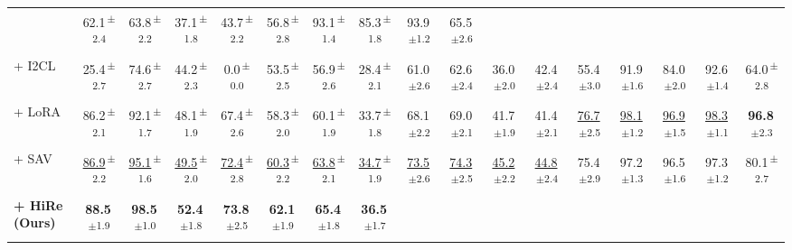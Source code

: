 \documentclass[sigconf,review,anonymous,9pt,table]{acmart}
\begin{document}
\begin{table}[t]
{\begin{tabular}{@{}l
  c c
  c c c c c
  c c c c
  c c c c c
  @{}}
  & 62.1\textsuperscript{\,$\pm$2.4} & 63.8\textsuperscript{\,$\pm$2.2} & 37.1\textsuperscript{\,$\pm$1.8} & 43.7\textsuperscript{\,$\pm$2.2}
  & 56.8\textsuperscript{\,$\pm$2.8} & 93.1\textsuperscript{\,$\pm$1.4} & 85.3\textsuperscript{\,$\pm$1.8} & 93.9\textsuperscript{\,$\pm$1.2} & 65.5\textsuperscript{\,$\pm$2.6} \\
+ I2CL~\cite{li2025implicit}
  & 25.4\textsuperscript{\,$\pm$2.7} & 74.6\textsuperscript{\,$\pm$2.7} & 44.2\textsuperscript{\,$\pm$2.3} & 0.0\textsuperscript{\,$\pm$0.0} & 53.5\textsuperscript{\,$\pm$2.5} & 56.9\textsuperscript{\,$\pm$2.6} & 28.4\textsuperscript{\,$\pm$2.1}
  & 61.0\textsuperscript{\,$\pm$2.6} & 62.6\textsuperscript{\,$\pm$2.4} & 36.0\textsuperscript{\,$\pm$2.0} & 42.4\textsuperscript{\,$\pm$2.4}
  & 55.4\textsuperscript{\,$\pm$3.0} & 91.9\textsuperscript{\,$\pm$1.6} & 84.0\textsuperscript{\,$\pm$2.0} & 92.6\textsuperscript{\,$\pm$1.4} & 64.0\textsuperscript{\,$\pm$2.8} \\
+ LoRA~\cite{hu2022lora}
  & 86.2\textsuperscript{\,$\pm$2.1} & 92.1\textsuperscript{\,$\pm$1.7} & 48.1\textsuperscript{\,$\pm$1.9} & 67.4\textsuperscript{\,$\pm$2.6} & 58.3\textsuperscript{\,$\pm$2.0} & 60.1\textsuperscript{\,$\pm$1.9} & 33.7\textsuperscript{\,$\pm$1.8}
  & 68.1\textsuperscript{\,$\pm$2.2} & 69.0\textsuperscript{\,$\pm$2.1} & 41.7\textsuperscript{\,$\pm$1.9} & 41.4\textsuperscript{\,$\pm$2.1}
  & \underline{76.7}\textsuperscript{\,$\pm$2.5} & \underline{98.1}\textsuperscript{\,$\pm$1.2} & \underline{96.9}\textsuperscript{\,$\pm$1.5} & \underline{98.3}\textsuperscript{\,$\pm$1.1} & \textbf{96.8}\textsuperscript{\,$\pm$2.3} \\
+ SAV~\cite{mitra2025enhancing}
  & \underline{86.9}\textsuperscript{\,$\pm$2.2} & \underline{95.1}\textsuperscript{\,$\pm$1.6} & \underline{49.5}\textsuperscript{\,$\pm$2.0} & \underline{72.4}\textsuperscript{\,$\pm$2.8} & \underline{60.3}\textsuperscript{\,$\pm$2.2} & \underline{63.8}\textsuperscript{\,$\pm$2.1} & \underline{34.7}\textsuperscript{\,$\pm$1.9}
  & \underline{73.5}\textsuperscript{\,$\pm$2.6} & \underline{74.3}\textsuperscript{\,$\pm$2.5} & \underline{45.2}\textsuperscript{\,$\pm$2.2} & \underline{44.8}\textsuperscript{\,$\pm$2.4}
  & 75.4\textsuperscript{\,$\pm$2.9} & 97.2\textsuperscript{\,$\pm$1.3} & 96.5\textsuperscript{\,$\pm$1.6} & 97.3\textsuperscript{\,$\pm$1.2} & 80.1\textsuperscript{\,$\pm$2.7} \\
\cellcolor{myblue!8}\textbf{+ HiRe (Ours)}
  & \cellcolor{myblue!8}\textbf{88.5}\textsuperscript{\,$\pm$1.9} & \cellcolor{myblue!8}\textbf{98.5}\textsuperscript{\,$\pm$1.0} & \cellcolor{myblue!8}\textbf{52.4}\textsuperscript{\,$\pm$1.8} & \cellcolor{myblue!8}\textbf{73.8}\textsuperscript{\,$\pm$2.5} & \cellcolor{myblue!8}\textbf{62.1}\textsuperscript{\,$\pm$1.9} & \cellcolor{myblue!8}\textbf{65.4}\textsuperscript{\,$\pm$1.8} & \cellcolor{myblue!8}\textbf{36.5}\textsuperscript{\,$\pm$1.7}

\end{tabular}}
\end{table}
\end{document}
